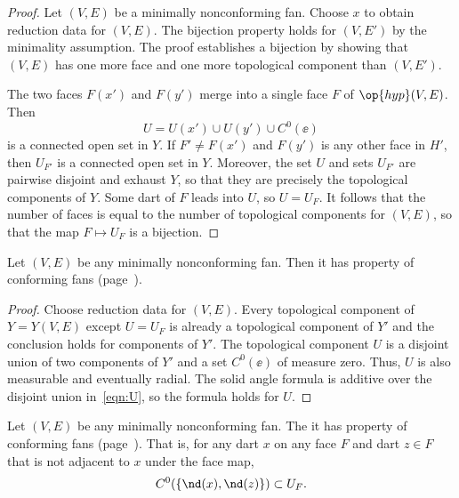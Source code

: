 \begin{proof} Let $(V,E)$ be a minimally nonconforming fan.  Choose
  $x$ to obtain reduction data for $(V,E)$.  The bijection property
  holds for $(V,E')$ by the minimality assumption.  The proof 
  establishes a bijection by showing that $(V,E)$ has one more face and
  one more topological component than $(V,E')$.

The
two faces $F(x')$ and $F(y')$ merge into a single face $F$ of
$\op{hyp}(V,E)$.  Then
\begin{equation}\label{eqn:U}
U= U(x')\cup U(y')\cup C^0(\ee)
\end{equation} 
is a connected open set in $Y$.  If $F'\ne F(x')$ and $F(y')$ is any other
face in $H'$, then $U_{F'}$ is a connected open set in $Y$.  Moreover,
the set $U$ and sets $U_{F'}$ are pairwise disjoint and exhaust $Y$,
so that they are precisely the topological components of $Y$.  Some
dart of $F$ leads into $U$, so $U=U_F$. 
It follows that the number of
faces is equal to the number of topological components for $(V,E)$, so that the
map $F\mapsto U_F$ is a bijection.
\end{proof}


\begin{lemma}[]\cutrate{} Let $(V,E)$ be any minimally
nonconforming fan.  Then it has property  of
conforming fans (page~\pageref{def:conforming}).
\end{lemma}

\begin{proof} Choose reduction data for $(V,E)$.  Every topological
component of $Y=Y(V,E)$ except $U=U_F$ is already a topological
component of $Y'$ and the conclusion holds for components of $Y'$.
The topological component $U$ is a disjoint union of two components
of $Y'$ and a set $C^0(\ee)$ of measure zero.  Thus, $U$ is also
measurable and eventually radial.  The solid angle formula is
additive over the disjoint union in~\eqref{eqn:U}, so the formula
holds for $U$.
\end{proof}
%


\begin{lemma}[]\cutrate{} 
  Let $(V,E)$ be any minimally nonconforming fan.  The it has property
   of conforming fans (page~\pageref{def:conforming}).
  That is, for any dart $x$ on any face $F$ and dart $z\in F$ that is
  not adjacent to $x$ under the face map,
\[ 
C^0(\{\nd(x),\nd(z)\}) \subset U_F.
\] 
\end{lemma}

